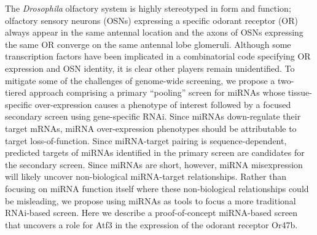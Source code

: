 The \emph{Drosophila} olfactory system is highly stereotyped in form and function; olfactory sensory neurons (OSNs) expressing a specific odorant receptor (OR) always appear in the same antennal location and the axons of OSNs expressing the same OR converge on the same antennal lobe glomeruli. Although some transcription factors have been implicated in a combinatorial code specifying OR expression and OSN identity, it is clear other players remain unidentified. To mitigate some of the challenges of genome-wide screening, we propose a two-tiered approach comprising a primary ``pooling'' screen for miRNAs whose tissue-specific over-expression causes a phenotype of interest followed by a focused secondary screen using gene-specific RNAi. Since miRNAs down-regulate their target mRNAs, miRNA over-expression phenotypes should be attributable to target loss-of-function. Since miRNA-target pairing is sequence-dependent, predicted targets of miRNAs identified in the primary screen are candidates for the secondary screen. Since miRNAs are short, however, miRNA misexpression will likely uncover non-biological miRNA-target relationships. Rather than focusing on miRNA function itself where these non-biological relationships could be misleading, we propose using miRNAs as tools to focus a more traditional RNAi-based screen. Here we describe a proof-of-concept miRNA-based screen that uncovers a role for Atf3 in the expression of the odorant receptor Or47b.